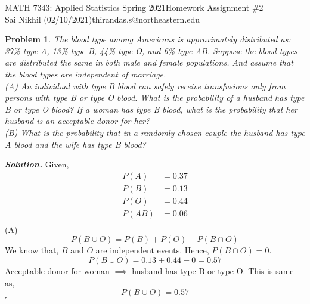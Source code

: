 \documentclass[12pt]{article}
\newtheorem{problem}{Problem}
\newenvironment{solution}[1][\it{Solution}]{\textbf{#1. } }{$\square$}
\begin{document}
\noindent MATH 7343: Applied Statistics Spring 2021\hfill Homework Assignment \#2\\
Sai Nikhil (02/10/2021)\hfill thirandas.s@northeastern.edu

\hrulefill


\begin{problem}
The blood type among Americans is approximately distributed as: 37\% type A, 13\% type B, 44\% type O, and 6\% type AB. Suppose the blood types are distributed the same in both male and female populations. And assume that the blood types are independent of marriage.\\
(A) An individual with type B blood can safely receive transfusions only from persons with type B or type O blood. What is the probability of a husband has type B or type O blood? If a woman has type B blood, what is the probability that her husband is an acceptable donor for her?\\
(B) What is the probability that in a randomly chosen couple the husband has type A blood and the wife has type B blood?
\end{problem}
\begin{solution}
Given,
\begin{align*}
P(A) &= 0.37\\
P(B) &= 0.13\\
P(O) &= 0.44\\
P(AB) &= 0.06\\
\end{align*}
(A)\\
$$P(B \cup O) = P(B) + P(O) - P(B \cap O)$$
We know that, $B$ and $O$ are independent events. Hence, $P(B \cap O) = 0$.
$$P(B \cup O) = 0.13 + 0.44 - 0 = \boxed{0.57}$$
Acceptable donor for woman $\implies$ husband has type B or type O. This is same as,
$$P(B \cup O) = \boxed{0.57}$$
\end{solution}
\end{document}
